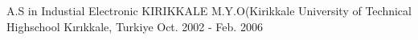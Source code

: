

\begin{cventries}

  \cventry
    {A.S in Industial Electronic} %
    {KIRIKKALE M.Y.O(Kirikkale University of Technical Highschool} %
    {Kırıkkale, Turkiye} %
    {Oct. 2002 - Feb. 2006} %
    {
      \begin{cvitems} %
        \item {}
      \end{cvitems}
    }

\end{cventries}
